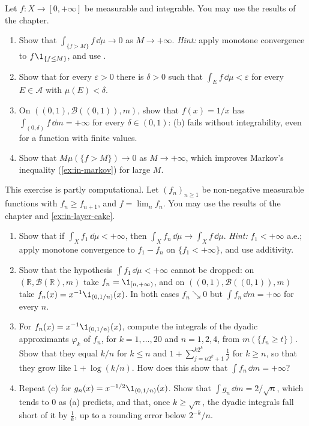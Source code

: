 \begin{exercise}\label{ex:in-abs-continuity}
\medium Let $f:X\to[0,+\infty]$ be measurable and integrable. You may use the results of the
chapter.
\begin{enumerate}[label=(\alph*)]
  \item Show that $\int_{\{f>M\}}f\,\dd\mu\to0$ as $M\to+\infty$. \emph{Hint:} apply monotone
    convergence to $f\1_{\{f\le M\}}$, and use .
  \item Show that for every $\varepsilon>0$ there is $\delta>0$ such that
    $\int_Ef\,\dd\mu<\varepsilon$ for every $E\in\mathcal A$ with $\mu(E)<\delta$.
  \item On $((0,1),\mathcal B((0,1)),m)$, show that $f(x)=1/x$ has $\int_{(0,\delta)}f\,\dd m=+\infty$
    for every $\delta\in(0,1)$: (b) fails without integrability, even for a function with finite
    values.
  \item Show that $M\mu(\{f>M\})\to0$ as $M\to+\infty$, which improves Markov's inequality
    (\cref{ex:in-markov}) for large $M$.
\end{enumerate}
\end{exercise}

\begin{exercise}\label{ex:in-decreasing}
\medium This exercise is partly computational. Let $(f_n)_{n\ge1}$ be non-negative measurable
functions with $f_n\ge f_{n+1}$, and $f=\lim_nf_n$. You may use the results of the chapter and
\cref{ex:in-layer-cake}.
\begin{enumerate}[label=(\alph*)]
  \item Show that if $\int_Xf_1\,\dd\mu<+\infty$, then $\int_Xf_n\,\dd\mu\to\int_Xf\,\dd\mu$.
    \emph{Hint:} $f_1<+\infty$ a.e.; apply monotone convergence to $f_1-f_n$ on
    $\{f_1<+\infty\}$, and use additivity.
  \item Show that the hypothesis $\int f_1\,\dd\mu<+\infty$ cannot be dropped: on
    $(\mathbb R,\mathcal B(\mathbb R),m)$ take $f_n=\1_{[n,+\infty)}$, and on
    $((0,1),\mathcal B((0,1)),m)$ take $f_n(x)=x^{-1}\1_{(0,1/n)}(x)$. In both cases
    $f_n\searrow0$ but $\int f_n\,\dd m=+\infty$ for every $n$.
  \item For $f_n(x)=x^{-1}\1_{(0,1/n)}(x)$, compute the integrals of the dyadic approximants
    $\varphi_k$ of $f_n$, for $k=1,\dots,20$ and $n=1,2,4$, from $m(\{f_n\ge t\})$. Show that they
    equal $k/n$ for $k\le n$ and $1+\sum_{j=n2^k+1}^{k2^k}\frac1j$ for $k\ge n$, so that they grow
    like $1+\log(k/n)$. How does this show that $\int f_n\,\dd m=+\infty$?
  \item Repeat (c) for $g_n(x)=x^{-1/2}\1_{(0,1/n)}(x)$. Show that $\int g_n\,\dd m=2/\sqrt n$,
    which tends to $0$ as (a) predicts, and that, once $k\ge\sqrt n$, the dyadic integrals fall
    short of it by $\frac1k$, up to a rounding error below $2^{-k}/n$.
\end{enumerate}
\end{exercise}

